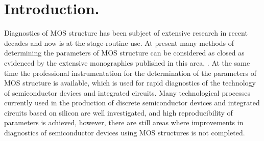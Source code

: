 \chapter{Introduction.} %
\label{Introduction} %

\iffalse \par Oblasť diagnostiky štruktúr MOS bola v posledných
desaťročiach predmetom rozsiahleho výskumu a v súčasnosti sa nachádza
v štádiu rutinného používania. Mnohé metodiky určovania parametrov
štruktúr MOS možno v súčasnosti považovať za uzavreté o čom svedčia
rozsiahle monografie publikované v tejto oblasti \cite{I.1} \cite{I.2}
\cite{I.3} \cite{I.4}. Zároveň je k dispozícii profesionálne
prístrojové vybavenie pre určovanie parametrov štruktúr MOS, ktoré
slúži pre rýchlu diagnostiku technológie výroby polovodičových prvkov
a integrovaných obvodov. Mnohé technologické postupy používané v
súčasnosti pri výrobe diskrétnych polovodičových súčiastok a
integrovaných obvodov na báze kremíka sú dostatočne preskúmané a pri
ich používaní sa dosahuje vysoká reprodukovateľnosť parametrov, avšak
stále ešte možno nájsť oblasti, v ktorých vývoj diagnostiky
polovodičových prvkov pomocou štruktúr MOS nie je ukončený.
\fi
Diagnostics of MOS structure has been subject of extensive research in
recent decades and now is at the stage-routine use. At present many
methods of determining the parameters of MOS structure can be
considered as closed as evidenced by the extensive monographies
published in this area, \cite{I.1} \cite{I.2} \cite{I.3}
\cite{I.4}. At the same time the professional instrumentation for the
determination of the parameters of MOS structure is available, which
is used for rapid diagnostics of the technology of semiconductor
devices and integrated circuits. Many technological processes
currently used in the production of discrete semiconductor devices and
integrated circuits based on silicon are well investigated, and high
reproducibility of parameters is achieved, however, there are still
areas where improvements in diagnostics of semiconductor devices using
MOS structures is not completed.

